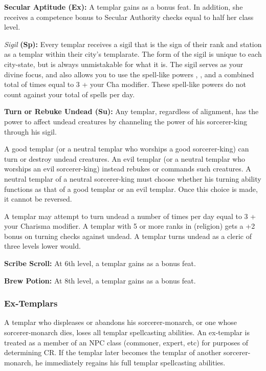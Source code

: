 \textbf{Secular Aptitude (Ex):} A templar gains  as a bonus feat. In addition, she receives a competence bonus to Secular Authority checks equal to half her class level.

\textit{Sigil} \textbf{(Sp):} Every templar receives a sigil that is the sign of their rank and station as a templar within their city's templarate. The form of the sigil is unique to each city-state, but is always unmistakable for what it is. The sigil serves as your divine focus, and also allows you to use the spell-like powers , , and  a combined total of times equal to 3 + your Cha modifier. These spell-like powers do not count against your total of spells per day.

\textbf{Turn or Rebuke Undead (Su):} Any templar, regardless of alignment, has the power to affect undead creatures by channeling the power of his sorcerer-king through his sigil.

A good templar (or a neutral templar who worships a good sorcerer-king) can turn or destroy undead creatures. An evil templar (or a neutral templar who worships an evil sorcerer-king) instead rebukes or commands such creatures. A neutral templar of a neutral sorcerer-king must choose whether his turning ability functions as that of a good templar or an evil templar. Once this choice is made, it cannot be reversed.

A templar may attempt to turn undead a number of times per day equal to 3 + your Charisma modifier. A templar with 5 or more ranks in  (religion) gets a +2 bonus on turning checks against undead. A templar turns undead as a cleric of three levels lower would.

\textbf{Scribe Scroll:} At 6th level, a templar gains  as a bonus feat.

\textbf{Brew Potion:} At 8th level, a templar gains  as a bonus feat.

\subsubsection{Ex-Templars}
A templar who displeases or abandons his sorcerer-monarch, or one whose sorcerer-monarch dies, loses all templar spellcasting abilities. An ex-templar is treated as a member of an NPC class (commoner, expert, etc) for purposes of determining CR. If the templar later becomes the templar of another sorcerer-monarch, he immediately regains his full templar spellcasting abilities.


